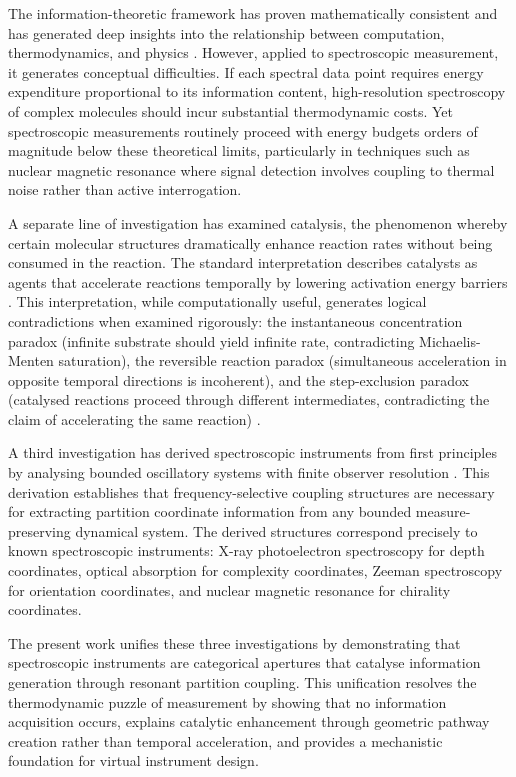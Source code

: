 \documentclass[12pt,a4paper]{article}
\theoremstyle{definition}
\theoremstyle{remark}
\begin{document}
The information-theoretic framework has proven mathematically consistent and has generated deep insights into the relationship between computation, thermodynamics, and physics \citep{bennett2003}. However, applied to spectroscopic measurement, it generates conceptual difficulties. If each spectral data point requires energy expenditure proportional to its information content, high-resolution spectroscopy of complex molecules should incur substantial thermodynamic costs. Yet spectroscopic measurements routinely proceed with energy budgets orders of magnitude below these theoretical limits, particularly in techniques such as nuclear magnetic resonance where signal detection involves coupling to thermal noise rather than active interrogation.

A separate line of investigation has examined catalysis, the phenomenon whereby certain molecular structures dramatically enhance reaction rates without being consumed in the reaction. The standard interpretation describes catalysts as agents that accelerate reactions temporally by lowering activation energy barriers \citep{eyring1935}. This interpretation, while computationally useful, generates logical contradictions when examined rigorously: the instantaneous concentration paradox (infinite substrate should yield infinite rate, contradicting Michaelis-Menten saturation), the reversible reaction paradox (simultaneous acceleration in opposite temporal directions is incoherent), and the step-exclusion paradox (catalysed reactions proceed through different intermediates, contradicting the claim of accelerating the same reaction) \citep{sachikonye2024catalysis}.

A third investigation has derived spectroscopic instruments from first principles by analysing bounded oscillatory systems with finite observer resolution \citep{sachikonye2024instruments}. This derivation establishes that frequency-selective coupling structures are necessary for extracting partition coordinate information from any bounded measure-preserving dynamical system. The derived structures correspond precisely to known spectroscopic instruments: X-ray photoelectron spectroscopy for depth coordinates, optical absorption for complexity coordinates, Zeeman spectroscopy for orientation coordinates, and nuclear magnetic resonance for chirality coordinates.

The present work unifies these three investigations by demonstrating that spectroscopic instruments are categorical apertures that catalyse information generation through resonant partition coupling. This unification resolves the thermodynamic puzzle of measurement by showing that no information acquisition occurs, explains catalytic enhancement through geometric pathway creation rather than temporal acceleration, and provides a mechanistic foundation for virtual instrument design.
\end{document}
